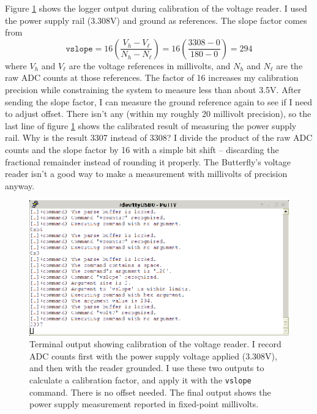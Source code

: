 Figure \ref{fig:caltrace} shows the logger output during calibration of the voltage reader.  I used the power supply rail (3.308V) and ground as references.  The slope factor comes from
\begin{equation}
    \mathtt{vslope} = 16 \left( \frac{V_h - V_{\ell}}{N_h - N_{\ell}} \right) =
        16 \left( \frac{3308 - 0}{180 - 0} \right) = 294
\end{equation}
where $V_h$ and $V_{\ell}$ are the voltage references in millivolts, and $N_h$ and $N_{\ell}$ are the raw ADC counts at those references.  The factor of 16 increases my calibration precision while constraining the system to measure less than about 3.5V.  After sending the slope factor, I can measure the ground reference again to see if I need to adjust offset.  There isn't any (within my roughly 20 millivolt precision), so the last line of figure \ref{fig:caltrace} shows the calibrated result of measuring the power supply rail.  Why is the result 3307 instead of 3308?  I divide the product of the raw ADC counts and the slope factor by 16 with a simple bit shift -- discarding the fractional remainder instead of rounding it properly.  The Butterfly's voltage reader isn't a good way to make a measurement with millivolts of precision anyway.      

\begin{figure}[ht]
    \begin{center}
        \includegraphics[clip,scale=2]{pngs/caltrace.eps}
        \caption{Terminal output showing calibration of the voltage reader.  I record ADC counts first with the power supply voltage applied (3.308V), and then with the reader grounded.  I use these two outputs to calculate a calibration factor, and apply it with the \texttt{vslope} command.  There is no offset needed.  The final output shows the power supply measurement reported in fixed-point millivolts.\label{fig:caltrace}}
    \end{center}
\end{figure}

